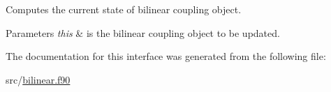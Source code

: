 Computes the current state of bilinear coupling object. 


\begin{DoxyParams}{Parameters}
{\em this} & is the bilinear coupling object to be updated. \\
\hline
\end{DoxyParams}


The documentation for this interface was generated from the following file\+:\begin{DoxyCompactItemize}
\item 
src/\hyperlink{bilinear_8f90}{bilinear.\+f90}\end{DoxyCompactItemize}
